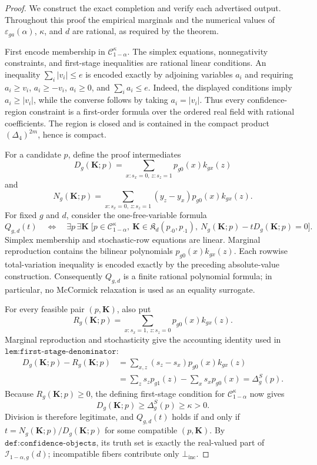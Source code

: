 \documentclass{article}
\begin{document}
\begin{proof}
We construct the exact completion and verify each advertised output.  Throughout this proof the empirical marginals and the numerical values of \(\varepsilon_{ga}(\alpha)\), \(\kappa\), and \(d\) are rational, as required by the theorem.

First encode membership in \(\mathcal C_{1-\alpha}^{\kappa}\).  The simplex equations, nonnegativity constraints, and first-stage inequalities are rational linear conditions.  An inequality \(\sum_i|v_i|\le e\) is encoded exactly by adjoining variables \(a_i\) and requiring \(a_i\ge v_i\), \(a_i\ge-v_i\), \(a_i\ge0\), and \(\sum_i a_i\le e\).  Indeed, the displayed conditions imply \(a_i\ge|v_i|\), while the converse follows by taking \(a_i=|v_i|\).  Thus every confidence-region constraint is a first-order formula over the ordered real field with rational coefficients.  The region is closed and is contained in the compact product \((\Delta_4)^{2m}\), hence is compact.

For a candidate \(p\), define the proof intermediates
\[
 D_g(\mathbf K;p)=\sum_{x:s_x=0,\,z:s_z=1}p_{g0}(x)k_{gx}(z)
\]
and
\[
 N_g(\mathbf K;p)=\sum_{x:s_x=0,\,z:s_z=1}(y_z-y_x)p_{g0}(x)k_{gx}(z).
\]
For fixed \(g\) and \(d\), consider the one-free-variable formula
\[
 Q_{g,d}(t)\quad\Longleftrightarrow\quad
 \exists p\,\exists\mathbf K\;
 \bigl[p\in\mathcal C_{1-\alpha}^{\kappa},\ 
 \mathbf K\in\mathfrak K_d(p_{\cdot0},p_{\cdot1}),\ 
 N_g(\mathbf K;p)-tD_g(\mathbf K;p)=0\bigr].
\]
Simplex membership and stochastic-row equations are linear.  Marginal reproduction contains the bilinear polynomials \(p_{g0}(x)k_{gx}(z)\).  Each rowwise total-variation inequality is encoded exactly by the preceding absolute-value construction.  Consequently \(Q_{g,d}\) is a finite rational polynomial formula; in particular, no McCormick relaxation is used as an equality surrogate.

For every feasible pair \((p,\mathbf K)\), also put
\[
 R_g(\mathbf K;p)=\sum_{x:s_x=1,\,z:s_z=0}p_{g0}(x)k_{gx}(z).
\]
Marginal reproduction and stochasticity give the accounting identity used in \(\texttt{lem:first-stage-denominator}\):
\[
\begin{aligned}
 D_g(\mathbf K;p)-R_g(\mathbf K;p)
 &=\sum_{x,z}(s_z-s_x)p_{g0}(x)k_{gx}(z)\\
 &=\sum_z s_zp_{g1}(z)-\sum_xs_xp_{g0}(x)
 =\Delta_g^S(p).
\end{aligned}
\]
Because \(R_g(\mathbf K;p)\ge0\), the defining first-stage condition for \(\mathcal C_{1-\alpha}^{\kappa}\) now gives
\[
 D_g(\mathbf K;p)\ge \Delta_g^S(p)\ge\kappa>0.
\]
Division is therefore legitimate, and \(Q_{g,d}(t)\) holds if and only if \(t=N_g(\mathbf K;p)/D_g(\mathbf K;p)\) for some compatible \((p,\mathbf K)\).  By \(\texttt{def:confidence-objects}\), its truth set is exactly the real-valued part of \(\mathcal I_{1-\alpha,g}(d)\); incompatible fibers contribute only \(\bot_{\mathrm{inc}}\).


\end{proof}
\end{document}
